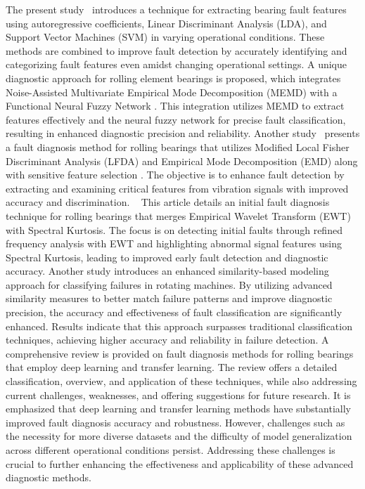 \documentclass[sn-basic,pdflatex]{sn-jnl}
\theoremstyle{remark}
\theoremstyle{definition}
\begin{document}
The present study \citep{WOS:000440977000032} ~introduces a technique
for extracting bearing fault features using autoregressive coefficients,
Linear Discriminant Analysis (LDA), and Support Vector Machines (SVM) in
varying operational conditions. These methods are combined to improve
fault detection by accurately identifying and categorizing fault
features even amidst changing operational settings. A unique diagnostic
approach for rolling element bearings is proposed, which integrates
Noise-Assisted Multivariate Empirical Mode Decomposition (MEMD) with a
Functional Neural Fuzzy Network \citep{WOS:000434717400001}. This
integration utilizes MEMD to extract features effectively and the neural
fuzzy network for precise fault classification, resulting in enhanced
diagnostic precision and reliability. Another study
\citep{WOS:000426284100001} ~presents a fault diagnosis method for
rolling bearings that utilizes Modified Local Fisher Discriminant
Analysis (LFDA) and Empirical Mode Decomposition (EMD) along with
sensitive feature selection . The objective is to enhance fault
detection by extracting and examining critical features from vibration
signals with improved accuracy and discrimination.
~\citep{WOS:000539546400083} This article details an initial fault
diagnosis technique for rolling bearings that merges Empirical Wavelet
Transform (EWT) with Spectral Kurtosis. The focus is on detecting
initial faults through refined frequency analysis with EWT and
highlighting abnormal signal features using Spectral Kurtosis, leading
to improved early fault detection and diagnostic accuracy. Another study
\citep{HAKIM:2023101945} introduces an enhanced similarity-based
modeling approach for classifying failures in rotating machines. By
utilizing advanced similarity measures to better match failure patterns
and improve diagnostic precision, the accuracy and effectiveness of
fault classification are significantly enhanced. Results indicate that
this approach surpasses traditional classification techniques, achieving
higher accuracy and reliability in failure detection. A comprehensive
review is provided on fault diagnosis methods for rolling bearings that
employ deep learning and transfer learning. The review offers a detailed
classification, overview, and application of these techniques, while
also addressing current challenges, weaknesses, and offering suggestions
for future research. It is emphasized that deep learning and transfer
learning methods have substantially improved fault diagnosis accuracy
and robustness. However, challenges such as the necessity for more
diverse datasets and the difficulty of model generalization across
different operational conditions persist. Addressing these challenges is
crucial to further enhancing the effectiveness and applicability of
these advanced diagnostic methods.
\end{document}
